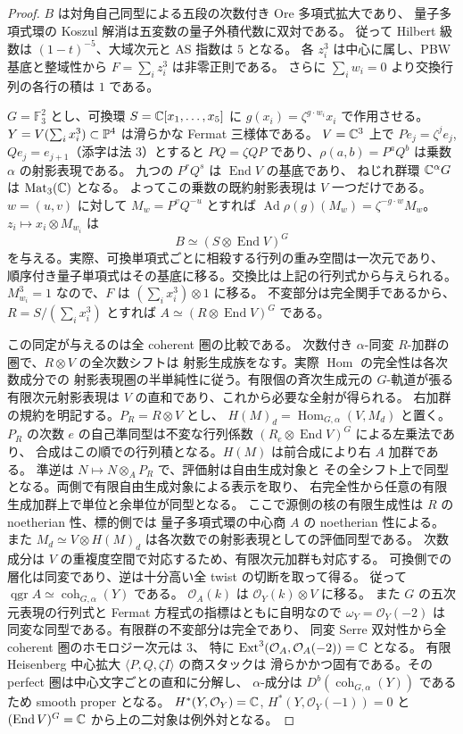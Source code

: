 \begin{proof}
$B$ は対角自己同型による五段の次数付き Ore 多項式拡大であり、
量子多項式環の Koszul 解消は五変数の量子外積代数に双対である。
従って Hilbert 級数は $(1-t)^{-5}$、大域次元と AS 指数は $5$ となる。
各 $z_i^3$ は中心に属し、PBW 基底と整域性から
$F=\sum_i z_i^3$ は非零正則である。
さらに $\sum_i w_i=0$ より交換行列の各行の積は $1$ である。

$G=\mathbb F_3^2$ とし、可換環 $S=\mathbb C[x_1,\ldots,x_5]$ に
$g(x_i)=\zeta^{g\cdot w_i}x_i$ で作用させる。
$Y=V(\sum_i x_i^3)\subset\mathbb P^4$ は滑らかな Fermat 三様体である。
$V=\mathbb C^3$ 上で $P e_j=\zeta^j e_j$, $Qe_j=e_{j+1}$（添字は法 $3$）とすると
$PQ=\zeta QP$ であり、$\rho(a,b)=P^aQ^b$ は乗数 $\alpha$ の射影表現である。
九つの $P^rQ^s$ は $\operatorname{End}V$ の基底であり、
ねじれ群環 $\mathbb C^\alpha G$ は $\operatorname{Mat}_3(\mathbb C)$ となる。
よってこの乗数の既約射影表現は $V$ 一つだけである。
$w=(u,v)$ に対して $M_w=P^vQ^{-u}$ とすれば
$\operatorname{Ad}\rho(g)(M_w)=\zeta^{-g\cdot w}M_w$。
$z_i\mapsto x_i\otimes M_{w_i}$ は
\[
 B\simeq (S\otimes\operatorname{End}V)^G
\]
を与える。実際、可換単項式ごとに相殺する行列の重み空間は一次元であり、
順序付き量子単項式はその基底に移る。交換比は上記の行列式から与えられる。
$M_{w_i}^3=1$ なので、$F$ は $(\sum_i x_i^3)\otimes 1$ に移る。
不変部分は完全関手であるから、$R=S/(\sum_i x_i^3)$ とすれば
$A\simeq(R\otimes\operatorname{End}V)^G$ である。

この同定が与えるのは全 coherent 圏の比較である。
次数付き $\alpha$-同変 $R$-加群の圏で、$R\otimes V$ の全次数シフトは
射影生成族をなす。実際 $\operatorname{Hom}$ の完全性は各次数成分での
射影表現圏の半単純性に従う。有限個の斉次生成元の $G$-軌道が張る
有限次元射影表現は $V$ の直和であり、これから必要な全射が得られる。
右加群の規約を明記する。$P_R=R\otimes V$ とし、
$H(M)_d=\operatorname{Hom}_{G,\alpha}(V,M_d)$ と置く。
$P_R$ の次数 $e$ の自己準同型は不変な行列係数
$(R_e\otimes\operatorname{End}V)^G$ による左乗法であり、
合成はこの順での行列積となる。$H(M)$ は前合成により右 $A$ 加群である。
準逆は $N\mapsto N\otimes_A P_R$ で、評価射は自由生成対象と
その全シフト上で同型となる。両側で有限自由生成対象による表示を取り、
右完全性から任意の有限生成加群上で単位と余単位が同型となる。
ここで源側の核の有限生成性は $R$ の noetherian 性、標的側では
量子多項式環の中心商 $A$ の noetherian 性による。
また $M_d\simeq V\otimes H(M)_d$ は各次数での射影表現としての評価同型である。
次数成分は $V$ の重複度空間で対応するため、有限次元加群も対応する。
可換側での層化は同変であり、逆は十分高い全 twist の切断を取って得る。
従って $\operatorname{qgr}A\simeq\operatorname{coh}_{G,\alpha}(Y)$ である。
$\mathcal O_A(k)$ は $\mathcal O_Y(k)\otimes V$ に移る。
また $G$ の五次元表現の行列式と Fermat 方程式の指標はともに自明なので
$\omega_Y=\mathcal O_Y(-2)$ は同変な同型である。有限群の不変部分は完全であり、
同変 Serre 双対性から全 coherent 圏のホモロジー次元は $3$、
特に $\operatorname{Ext}^3(\mathcal O_A,\mathcal O_A(-2))=\mathbb C$ となる。
有限 Heisenberg 中心拡大 $\langle P,Q,\zeta I\rangle$ の商スタックは
滑らかかつ固有である。その perfect 圏は中心文字ごとの直和に分解し、
$\alpha$-成分は $D^b(\operatorname{coh}_{G,\alpha}(Y))$ であるため smooth proper となる。
$H^*(Y,\mathcal O_Y)=\mathbb C$, $H^*(Y,\mathcal O_Y(-1))=0$ と
$(\operatorname{End}V)^G=\mathbb C$ から上の二対象は例外対となる。


\end{proof}

